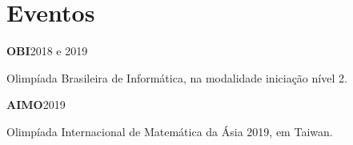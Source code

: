 \section{Eventos}
    \resumeSubHeadingListStart

    \resumeProjectHeading
    {\textbf{OBI}}{2018 e 2019}
    
    Olimpíada Brasileira de Informática, na modalidade
    iniciação nível 2.
    
    \resumeProjectHeading
    {\textbf{AIMO}}{2019}

    Olimpíada Internacional de Matemática da Ásia 2019, em Taiwan.
    
    \resumeSubHeadingListEnd
